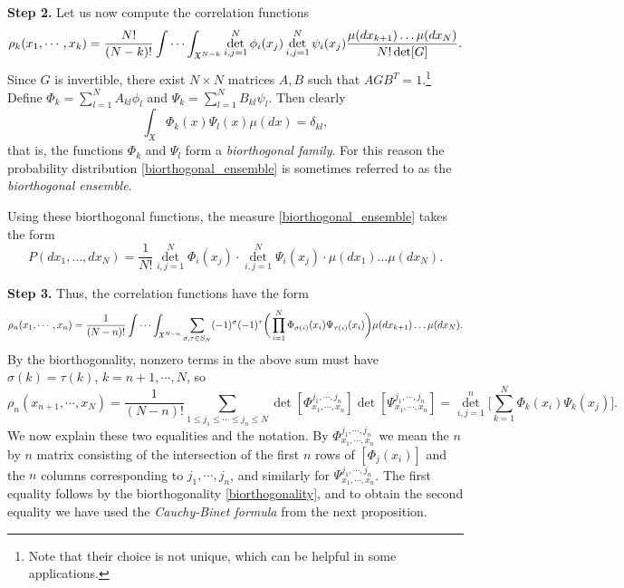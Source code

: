 \documentclass[letterpaper,11pt,oneside,reqno]{amsart}
\numberwithin{equation}{section}
\newcommand{\Det}{\mathop{\mathrm{det}}\limits}
\theoremstyle{definition}
\begin{document}
\textbf{Step 2.} Let us now compute the correlation functions
\begin{equation*}
  \rho_k(x_1,\cdots, x_k)=\frac{N!}{(N-k)!}
  \idotsint_{\mathfrak{X}^{N-k}} 
  \Det_{i,j=1}^{N}\phi_i(x_j)\Det_{i,j=1}^{N}\psi_i(x_j) \frac{\mu(dx_{k+1})\ldots
  \mu(dx_N)}{N!\det[G]}.
\end{equation*}
Since $G$ is invertible, there exist $N\times N$
matrices $A, B$ such that $AGB^T=1$.\footnote{Note that
their choice is not unique,
which can be helpful in some applications.} 
Define $\Phi_k=\sum_{l=1}^{N} A_{kl}\phi_l$ and $\Psi_k=\sum_{l=1}^{N} B_{kl}\psi_l$. Then clearly
\begin{equation}\label{biorthogonality}
  \int_{\mathfrak{X}}\Phi_k(x)\Psi_l(x)\mu(dx)=\delta_{kl},
\end{equation}
that is, the functions $\Phi_k$ and $\Psi_l$ form a \emph{biorthogonal family}.
For this reason the probability distribution \eqref{biorthogonal_ensemble}
is sometimes referred to as the \emph{biorthogonal ensemble}.

Using these biorthogonal functions, the measure \eqref{biorthogonal_ensemble} takes the form
\begin{equation*}
  P(dx_1,\ldots,dx_N)=\frac{1}{N!} \Det_{i,j=1}^{N}\Phi_i(x_j)\cdot \Det_{i,j=1}^{N}\Psi_i(x_j)\cdot \mu(dx_1)\ldots\mu(dx_N).
\end{equation*}

\textbf{Step 3.}
Thus, the correlation functions have the form
\begin{equation*}
  \rho_n(x_1,\cdots, x_n)=\frac{1}{(N-n)!}\idotsint_{\mathfrak{X}^{N-n}} 
  \sum_{\sigma, \tau\in S_N} (-1)^{\sigma}(-1)^{\tau} 
  \bigg(\prod_{i=1}^N \Phi_{\sigma(i)}(x_i)\Psi_{\tau(i)}(x_i)\bigg)
  \mu(dx_{k+1})\ldots\mu(dx_N).
\end{equation*}
By the biorthogonality, nonzero terms in the above sum must have $\sigma(k)=\tau(k)$, $k=n+1,\cdots, N$, so
\begin{equation}
  \rho_n(x_{n+1},\cdots, x_N) = \frac{1}{(N-n)!} \sum_{1\leq j_1\leq\cdots\leq j_n\leq N} \det[\Phi_{x_1,\cdots, x_n}^{j_1,\cdots, j_n}] \det[\Psi_{x_1,\cdots, x_n}^{j_1,\cdots, j_n}] 
  = \Det_{i,j=1}^{n}\bigg[\sum_{k=1}^N \Phi_k(x_i) \Psi_k(x_j)\bigg].
  \label{Final_computation_of_corr_kernel}
\end{equation}
We now explain these two equalities and the notation. 
By $\Phi_{x_1,\cdots, x_n}^{j_1,\cdots, j_n}$ 
we mean the $n$ by $n$ matrix consisting of the 
intersection of the first $n$ rows of $[\Phi_j(x_i)]$ 
and the $n$ columns corresponding to $j_1,\cdots, j_n$,
and similarly for $\Psi_{x_1,\cdots, x_n}^{j_1,\cdots, j_n}$.
The first equality follows by the biorthogonality \eqref{biorthogonality}, and 
to obtain the second equality we have used the \emph{Cauchy-Binet formula} from the next proposition.
\end{document}
